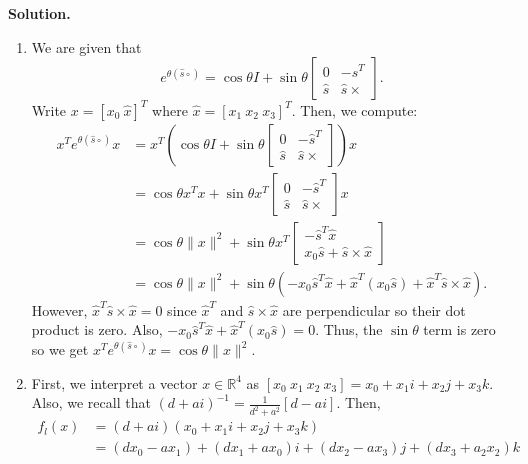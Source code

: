 \documentclass[11pt]{article}
\begin{document}
\textbf{Solution.}
\begin{enumerate}
    \item We are given that
        \[
            e^{\theta (\hat s \circ)} = \cos \theta I + \sin \theta \begin{bmatrix} 0 & - \hat{s}^{T} \\ \hat{s} & \hat{s} \times  \end{bmatrix}
        .\] 
        Write $x = [x_0 \ \hat{x}]^{T}$ where $\hat{x} = [x_1 \  x_2\  x_3]^{T}$.
        Then, we compute:
        \begin{align*}
             x^T e^{\theta (\hat s \circ)} x &=  x^{T}(\cos \theta I + \sin \theta \begin{bmatrix} 0 & - \hat{s}^{T} \\ \hat{s} & \hat{s} \times  \end{bmatrix})x\\
                                             &=\cos \theta x^{T} x + \sin \theta x^{T}\begin{bmatrix} 0 & - \hat{s}^{T} \\ \hat{s} & \hat{s} \times  \end{bmatrix}x\\
                                            &= \cos \theta \|x\|^2 + \sin \theta x^T \begin{bmatrix} -\hat s^T \hat x\\ x_0 \hat s + \hat s \times \hat x \end{bmatrix} \\
                                            &= \cos \theta \|x\|^2 + \sin \theta \left( -x_0 \hat s^T \hat x + \hat x^T (x_0 \hat s) + \hat x^T \hat s \times \hat x \right) 
        .\end{align*}
        However, $\hat x^T \hat s \times \hat x = 0$ since $\hat x^T$ and $\hat s \times  \hat x $ are perpendicular so their dot product is zero.
        Also, $-x_0 \hat s^T \hat x + \hat x^T (x_0 \hat s) = 0$. Thus, the $\sin\theta$ term is zero so we get $x^T e^{\theta (\hat s \circ)} x = \cos \theta \|x\|^2$.
    \item 
        First, we interpret a vector $x \in \mathbb{R}^{4}$ as $[x_0\ x_1\ x_2\ x_3] = x_0 + x_1i + x_2j + x_3k$.
        Also, we recall that $(d+ai)^{-1} = \frac{1}{d^2 + a^2} [d - ai]$.
        Then,
        \begin{align*}
            f_l (x) &= (d + ai) (x_0 + x_1i + x_2j + x_3k) \\
            &= (dx_0 - ax_1) + (dx_1 + ax_0) i + (dx_2 - ax_3) j + (dx_3 + a_2 x_2) k \\

\end{align*}
\end{enumerate}
\end{document}
